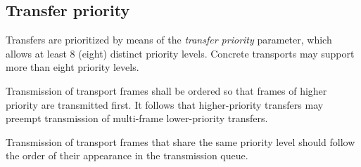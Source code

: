 \subsection{Transfer priority}\label{sec:transport_transfer_priority}

Transfers are prioritized by means of the \emph{transfer priority} parameter,
which allows at least 8 (eight) distinct priority levels.
Concrete transports may support more than eight priority levels.

Transmission of transport frames shall be ordered so that frames of higher priority are transmitted first.
It follows that higher-priority transfers may preempt transmission of multi-frame lower-priority transfers.

Transmission of transport frames that share the same priority level should follow the order of their appearance in
the transmission queue.

